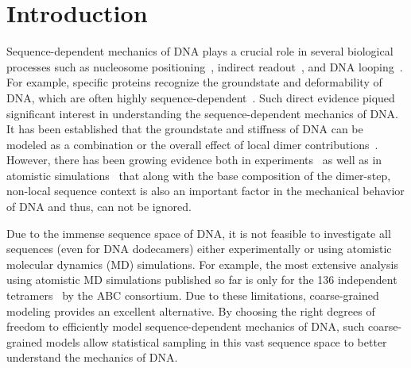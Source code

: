 \section{Introduction}
Sequence-dependent mechanics of DNA plays a crucial role in several biological processes such as nucleosome positioning~\cite{segal2006genomic,segal2009controls}, indirect readout~\cite{chen2001indirect,napoli2006indirect}, and DNA looping~\cite{schleif1992dna,adhya1989multipartite}.
For example, specific proteins recognize the groundstate and deformability of DNA, which are often highly sequence-dependent~\cite{chen2001indirect,napoli2006indirect,rohs2009role,paillard2004analyzing,juo1996proteins}. 
Such direct evidence piqued significant interest in understanding the sequence-dependent mechanics of DNA.
It has been established that the groundstate and stiffness of DNA can be modeled as a combination or the overall effect of
local dimer contributions~\cite{lebrun1997local,okonogi2000sequence,okonogi2002sequence,dickerson1998dna}.
However, there has been growing evidence both in 
experiments~\cite{mack2001intrinsic,yanagi1991analysis} as well as in atomistic 
simulations~\cite{pasi2014muabc,lankavs2003dna,dixit2005molecular} that along with
the base composition of the dimer-step, non-local sequence context is also an important factor in the mechanical behavior of DNA  and thus, can not be ignored.

Due to the immense sequence space of DNA, it is not feasible to investigate all sequences (even for DNA dodecamers) either experimentally or using atomistic molecular dynamics (MD) simulations.
For example, the most extensive analysis using atomistic MD simulations published so far is only for the 136 independent tetramers~\cite{pasi2014muabc,dixit2005molecular} by the ABC consortium.
Due to these limitations, coarse-grained modeling provides an excellent alternative. By choosing the right degrees of freedom to efficiently model sequence-dependent mechanics of DNA, such coarse-grained models allow statistical sampling in this vast sequence space to better understand the mechanics of DNA.

